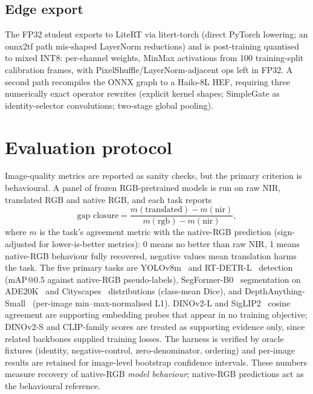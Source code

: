 \documentclass[10pt,twocolumn,letterpaper]{article}
\begin{document}
\subsection{Edge export}
\label{sec:export}

The FP32 student exports to LiteRT via litert-torch (direct PyTorch lowering; an onnx2tf path mis-shaped LayerNorm reductions) and is post-training quantised to mixed INT8: per-channel weights, MinMax activations from 100 training-split calibration frames, with PixelShuffle/LayerNorm-adjacent ops left in FP32. A second path recompiles the ONNX graph to a Hailo-8L HEF, requiring three numerically exact operator rewrites (explicit kernel shapes; SimpleGate as identity-selector convolutions; two-stage global pooling).

\section{Evaluation protocol}
\label{sec:eval}

Image-quality metrics are reported as sanity checks, but the primary criterion is behavioural. A panel of frozen RGB-pretrained models is run on raw NIR, translated RGB and native RGB, and each task reports
\[
\text{gap closure} = \frac{m(\text{translated}) - m(\text{nir})}{m(\text{rgb}) - m(\text{nir})},
\]
where $m$ is the task's agreement metric with the native-RGB prediction (sign-adjusted for lower-is-better metrics): 0 means no better than raw NIR, 1 means native-RGB behaviour fully recovered, negative values mean translation harms the task. The five primary tasks are YOLOv8m~\cite{jocher2023yolov8} and RT-DETR-L~\cite{zhao2024rtdetr} detection (mAP@0.5 against native-RGB pseudo-labels), SegFormer-B0~\cite{xie2021segformer} segmentation on ADE20K~\cite{zhou2017ade20k} and Cityscapes~\cite{cordts2016cityscapes} distributions (class-mean Dice), and DepthAnything-Small~\cite{yang2024depthanything} (per-image min--max-normalised L1). DINOv2-L and SigLIP2~\cite{tschannen2025siglip2} cosine agreement are supporting embedding probes that appear in no training objective; DINOv2-S and CLIP-family scores are treated as supporting evidence only, since related backbones supplied training losses. The harness is verified by oracle fixtures (identity, negative-control, zero-denominator, ordering) and per-image results are retained for image-level bootstrap confidence intervals. These numbers measure recovery of native-RGB \emph{model behaviour}; native-RGB predictions act as the behavioural reference.
\end{document}
